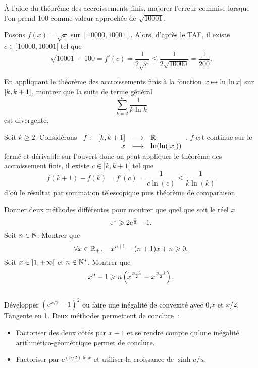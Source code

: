 \documentclass{magnolia}
\begin{document}
À l'aide du théorème des accroissements finis, majorer l'erreur commise lorsque
l'on prend 100 comme valeur approchée de $\sqrt{10001}$.

\begin{sol}
Posons $f(x)=\sqrt x$ sur $[10000,10001]$. Alors, d'après le TAF, il existe $c \in ]10000,10001[$ tel que $$\sqrt{10001}-100=f'(c)=\frac{1}{2\sqrt c}\leq \frac{1}{2\sqrt{10000}}=\frac{1}{200}.$$
\end{sol}

En appliquant le théorème des accroissements finis à la fonction
$x\mapsto\ln\left|\ln x\right|$ sur $\left[k,k+1\right]$, montrer que la suite de terme
général
\[\sum_{k=2}^n \frac{1}{k\ln k}\]
est divergente.

\begin{sol}
Soit $k\geq 2$. Considérons $\begin{array}[t]{lrcl} \displaystyle{f} : & \displaystyle{[k,k+1]} & \longrightarrow & \displaystyle{\mathbb{R}} \\ & \displaystyle{x} & \longmapsto & \displaystyle{\ln(\ln(|x|))} \end{array}$. $f$ est continue sur le fermé et dérivable sur l'ouvert donc on peut appliquer le théorème des accroissement finis, il existe $c\in ]k,k+1[$ tel que $$f(k+1)-f(k)=f'(c)=\frac{1}{c\ln(c)}\leq \dfrac{1}{k\ln(k)}$$ d'où le résultat par sommation télescopique puis théorème de comparaison.
\end{sol}



\begin{questions}
\question Donner deux méthodes différentes pour montrer que quel que soit le
  réel $x$
  \[{\rm e}^x \geqslant 2{\rm e}^{\frac{x}{2}}-1.\]
\question Soit $n\in\mathbb{N}$. Montrer que
  \[\forall x\in\mathbb{R}_+ ,\quad x^{n+1}-(n+1)x+n \geqslant 0.\]
\question Soit $x\in\left]1,+\infty\right[$ et $n\in{\mathbb{N}^*}$. Montrer que
  \[x^n-1 \geqslant n\left(x^{\frac{n+1}{2}}-x^{\frac{n-1}{2}}\right).\]
\end{questions}
\begin{sol}
$\quad$
\begin{questions}
\question Développer $(e^{x/2}-1)^2$ ou faire une inégalité de convexité avec
  0,$x$ et $x/2$.
\question Tangente en 1.
\question Deux méthodes permettent de conclure~:
  \begin{itemize}
  \item Factoriser des deux côtés par $x-1$ et se rendre compte qu'une inégalité
    arithmético-géométrique permet de conclure.
  \item Factoriser par $e^{(n/2)\ln x}$ et utiliser la croissance de $\sinh u/u$.
  \end{itemize}
\end{questions}
\end{sol}
\end{document}
